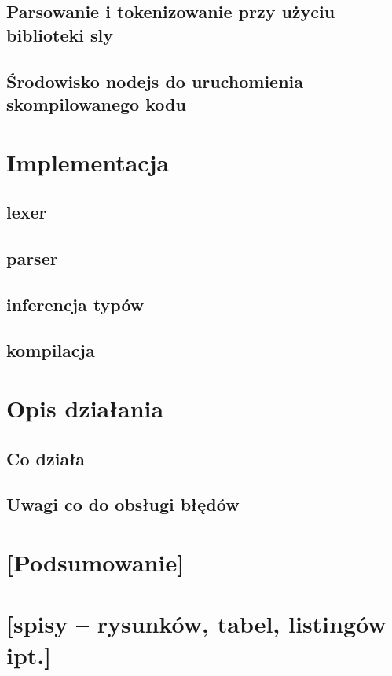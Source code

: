\documentclass{article}
\begin{document}
    \subsection{Parsowanie i tokenizowanie przy użyciu biblioteki sly}
    \subsection{Środowisko nodejs do uruchomienia skompilowanego kodu}
\section{Implementacja}
    \subsection{lexer}
    \subsection{parser}
    \subsection{inferencja typów}
    \subsection{kompilacja}
\section{Opis działania}
    \subsection{Co działa}
    \subsection{Uwagi co do obsługi błędów}
\section{[Podsumowanie]}
\section{[spisy -- rysunków, tabel, listingów ipt.]}


\end{document}
